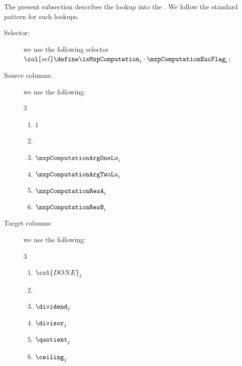 The present subsection describes the lookup into the \eucMod{}.
We follow the standard pattern for such lookups.
\begin{description}
	\item[Selector:] we use the following selector $\col{sel} \define \isMxpComputation _{i} \cdot \mxpComputationEucFlag _{i}$;
	\item[Source columns:] we use the following:
		\begin{multicols}{3}
			\begin{enumerate}
				\item $1$
				\item[\vspace{\fill}]
				\item $\mxpComputationArgOneLo _{i}$
				\item $\mxpComputationArgTwoLo _{i}$
				\item $\mxpComputationResA     _{i}$
				\item $\mxpComputationResB     _{i}$
			\end{enumerate}
		\end{multicols}
	\item[Target columns:] we use the following:
		\begin{multicols}{3}
			\begin{enumerate}
				\item $\col{DONE} _{j}$
				\item[\vspace{\fill}]
				\item $\dividend _{j}$
				\item $\divisor  _{j}$
				\item $\quotient _{j}$
				\item $\ceiling  _{j}$
			\end{enumerate}
		\end{multicols}
\end{description}

